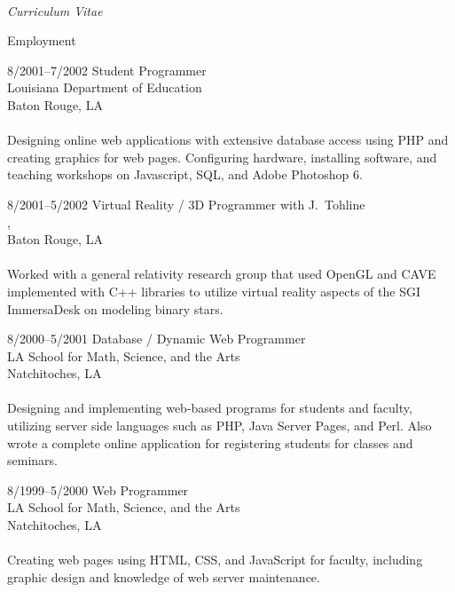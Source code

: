 \documentclass[10pt]{article}
\begin{document}
\begin{cv}{\name\\{\large \itshape Curriculum Vitae}}
\begin{cvlist}{Employment}
	\item[8/2001--7/2002] Student Programmer\\
	Louisiana Department of Education\\
	Baton Rouge, LA\\
	\\
	Designing online web applications with extensive database access using PHP and 
	creating graphics for web pages. Configuring hardware, installing software, 
	and teaching workshops on Javascript, SQL, and Adobe Photoshop 6.
	
	\item[8/2001--5/2002] Virtual Reality / 3D Programmer with J.~Tohline\\
	\institute, \dept\\
	Baton Rouge, LA\\
	\\
	Worked with a general relativity research group that used OpenGL and
	CAVE implemented with C++ libraries to utilize virtual reality aspects of
	the SGI ImmersaDesk on modeling binary stars.
	
	\item[8/2000--5/2001] Database / Dynamic Web Programmer\\
	LA School for Math, Science, and the Arts\\
	Natchitoches, LA\\
	\\
	Designing and implementing web-based programs for students and faculty,
	utilizing server side languages such as PHP, Java Server Pages, and Perl.
	Also wrote a complete online application for registering students for classes and seminars.
	
	\item[8/1999--5/2000] Web Programmer\\
	LA School for Math, Science, and the Arts\\
	Natchitoches, LA\\
	\\
	Creating web pages using HTML, CSS, and JavaScript for faculty, including
	graphic design and knowledge of web server maintenance.
\end{cvlist}

\setlength{\oldcvlabelwidth}{\cvlabelwidth}
\setlength{\cvlabelwidth}{1em}
\renewcommand*{\bibindent}{1.5em}
\newcommand*{\biblabelsep}{1.5em}


\end{cv}
\end{document}
